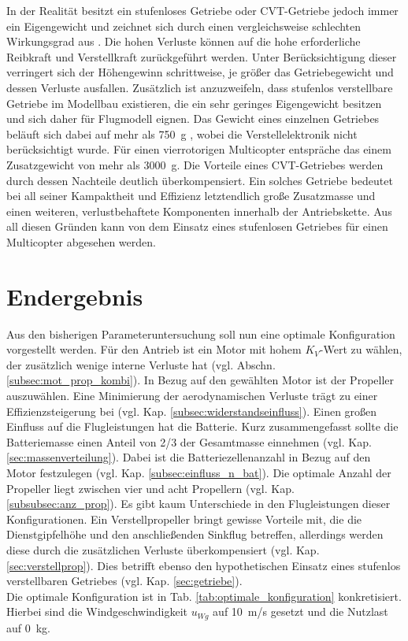 In der Realität besitzt ein stufenloses Getriebe oder CVT-Getriebe jedoch immer ein Eigengewicht und zeichnet sich durch einen vergleichsweise schlechten Wirkungsgrad aus \cite[S.295-S.297]{Fischer.2016}. %
Die hohen Verluste können auf die hohe erforderliche Reibkraft und Verstellkraft zurückgeführt werden. Unter Berücksichtigung dieser verringert sich der Höhengewinn schrittweise, je größer das Getriebegewicht und dessen Verluste ausfallen. 
Zusätzlich ist anzuzweifeln, dass stufenlos verstellbare Getriebe im Modellbau existieren, die ein sehr geringes Eigengewicht besitzen und sich daher für Flugmodell eignen.
Das Gewicht eines einzelnen Getriebes beläuft sich dabei auf mehr als \SI{750}{g} \cite{cvt}, wobei die Verstellelektronik nicht berücksichtigt wurde. Für einen vierrotorigen Multicopter entspräche das einem Zusatzgewicht von mehr als \SI{3000}{g}. 
Die Vorteile eines CVT-Getriebes werden durch dessen Nachteile deutlich überkompensiert. Ein solches Getriebe bedeutet bei all seiner Kampaktheit und Effizienz letztendlich große Zusatzmasse und einen weiteren, verlustbehaftete Komponenten innerhalb der Antriebskette. Aus all diesen Gründen kann von dem Einsatz eines stufenlosen Getriebes für einen Multicopter abgesehen werden.


\section{Endergebnis}
\label{sec:Endergbnis}
Aus den bisherigen Parameteruntersuchung soll nun eine optimale Konfiguration vorgestellt werden.
Für den Antrieb ist ein Motor mit hohem \ensuremath{K_V}-Wert zu wählen, der zusätzlich wenige interne Verluste hat (vgl. Abschn. \ref{subsec:mot_prop_kombi}). In Bezug auf den gewählten Motor ist der Propeller auszuwählen. Eine Minimierung der aerodynamischen Verluste trägt zu einer Effizienzsteigerung bei (vgl. Kap. \ref{subsec:widerstandseinfluss}). Einen großen Einfluss auf die Flugleistungen hat die Batterie. Kurz zusammengefasst sollte die Batteriemasse einen Anteil von 2/3 der Gesamtmasse einnehmen (vgl. Kap. \ref{sec:massenverteilung}). Dabei ist die Batteriezellenanzahl in Bezug auf den Motor festzulegen (vgl. Kap. \ref{subsec:einfluss_n_bat}).
Die optimale Anzahl der Propeller liegt zwischen vier und acht Propellern (vgl. Kap. \ref{subsubsec:anz_prop}). Es gibt kaum Unterschiede in den Flugleistungen dieser Konfigurationen. Ein Verstellpropeller bringt gewisse Vorteile mit, die die Dienstgipfelhöhe und den anschließenden Sinkflug betreffen, allerdings werden diese durch die zusätzlichen Verluste überkompensiert (vgl. Kap. \ref{sec:verstellprop}). Dies betrifft ebenso den hypothetischen Einsatz eines stufenlos verstellbaren Getriebes (vgl. Kap. \ref{sec:getriebe}). \\
Die optimale Konfiguration ist in Tab. \ref{tab:optimale_konfiguration} konkretisiert. Hierbei sind die Windgeschwindigkeit \ensuremath{u_{Wg}} auf \SI{10}{m/s} gesetzt und die Nutzlast auf \SI{0}{kg}.

